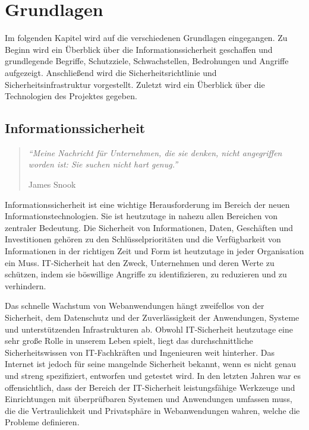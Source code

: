\chapter{Grundlagen}
\label{cha:k2}

Im folgenden Kapitel wird auf die verschiedenen Grundlagen eingegangen. Zu Beginn wird ein Überblick über die Informationssicherheit geschaffen und grundlegende Begriffe, Schutzziele, Schwachstellen, Bedrohungen und Angriffe aufgezeigt. Anschließend wird die Sicherheitsrichtlinie und Sicherheitsinfrastruktur vorgestellt. Zuletzt wird ein Überblick über die Technologien des Projektes gegeben.

\section{Informationssicherheit}

\begin{quote}
	\emph{"`Meine Nachricht für Unternehmen, die sie denken, nicht angegriffen worden ist: Sie suchen nicht hart genug."'}
	\begin{flushright}
		James Snook
	\end{flushright}
\end{quote}

Informationssicherheit ist eine wichtige Herausforderung im Bereich der neuen Informationstechnologien. Sie ist heutzutage in nahezu allen Bereichen von zentraler Bedeutung.  Die Sicherheit von Informationen, Daten, Geschäften und Investitionen gehören zu den Schlüsselprioritäten und die Verfügbarkeit von Informationen in der richtigen Zeit und Form ist heutzutage in jeder Organisation ein Muss. IT-Sicherheit hat den Zweck, Unternehmen und deren Werte zu schützen, indem sie böswillige Angriffe zu identifizieren, zu reduzieren und zu verhindern.

Das schnelle Wachstum von Webanwendungen hängt zweifellos von der Sicherheit, dem Datenschutz und der Zuverlässigkeit der Anwendungen, Systeme und unterstützenden Infrastrukturen ab. Obwohl IT-Sicherheit heutzutage eine sehr große Rolle in unserem Leben spielt, liegt das durchschnittliche Sicherheitswissen von IT-Fachkräften und Ingenieuren weit hinterher. Das Internet ist jedoch für seine mangelnde Sicherheit bekannt, wenn es nicht genau und streng spezifiziert, entworfen und getestet wird. In den letzten Jahren war es offensichtlich, dass der Bereich der IT-Sicherheit leistungsfähige Werkzeuge und Einrichtungen mit überprüfbaren Systemen und Anwendungen umfassen muss, die die Vertraulichkeit und Privatsphäre in Webanwendungen wahren, welche die Probleme definieren\cite[1]{furnell2008securing}.

